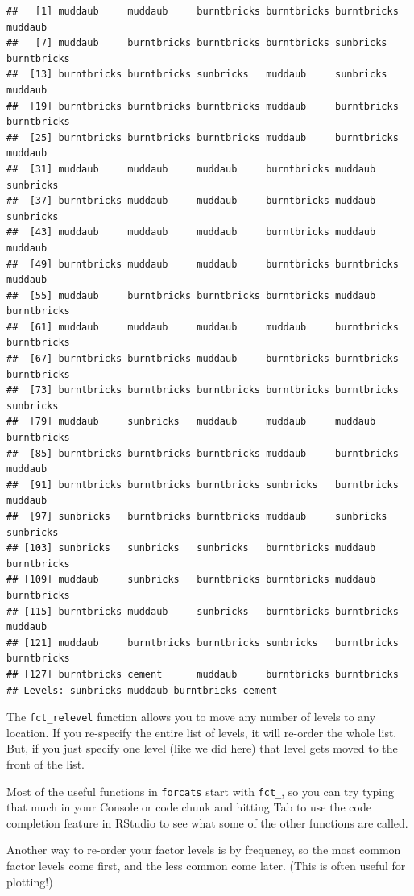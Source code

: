 \documentclass[]{book}
\begin{document}
\begin{verbatim}
##   [1] muddaub     muddaub     burntbricks burntbricks burntbricks muddaub    
##   [7] muddaub     burntbricks burntbricks burntbricks sunbricks   burntbricks
##  [13] burntbricks burntbricks sunbricks   muddaub     sunbricks   muddaub    
##  [19] burntbricks burntbricks burntbricks muddaub     burntbricks burntbricks
##  [25] burntbricks burntbricks burntbricks muddaub     burntbricks muddaub    
##  [31] muddaub     muddaub     muddaub     burntbricks muddaub     sunbricks  
##  [37] burntbricks muddaub     muddaub     burntbricks muddaub     sunbricks  
##  [43] muddaub     muddaub     muddaub     burntbricks muddaub     muddaub    
##  [49] burntbricks muddaub     muddaub     burntbricks burntbricks muddaub    
##  [55] muddaub     burntbricks burntbricks burntbricks muddaub     burntbricks
##  [61] muddaub     muddaub     muddaub     muddaub     burntbricks burntbricks
##  [67] burntbricks burntbricks muddaub     burntbricks burntbricks burntbricks
##  [73] burntbricks burntbricks burntbricks burntbricks burntbricks sunbricks  
##  [79] muddaub     sunbricks   muddaub     muddaub     muddaub     burntbricks
##  [85] burntbricks burntbricks burntbricks muddaub     burntbricks muddaub    
##  [91] burntbricks burntbricks burntbricks sunbricks   burntbricks muddaub    
##  [97] sunbricks   burntbricks burntbricks muddaub     sunbricks   sunbricks  
## [103] sunbricks   sunbricks   sunbricks   burntbricks muddaub     burntbricks
## [109] muddaub     sunbricks   burntbricks burntbricks muddaub     burntbricks
## [115] burntbricks muddaub     sunbricks   burntbricks burntbricks muddaub    
## [121] muddaub     burntbricks burntbricks sunbricks   burntbricks burntbricks
## [127] burntbricks cement      muddaub     burntbricks burntbricks
## Levels: sunbricks muddaub burntbricks cement
\end{verbatim}

The \texttt{fct\_relevel} function allows you to move any number of
levels to any location. If you re-specify the entire list of levels, it
will re-order the whole list. But, if you just specify one level (like
we did here) that level gets moved to the front of the list.

Most of the useful functions in \texttt{forcats} start with
\texttt{fct\_}, so you can try typing that much in your Console or code
chunk and hitting Tab to use the code completion feature in RStudio to
see what some of the other functions are called.

Another way to re-order your factor levels is by frequency, so the most
common factor levels come first, and the less common come later. (This
is often useful for plotting!)
\end{document}
